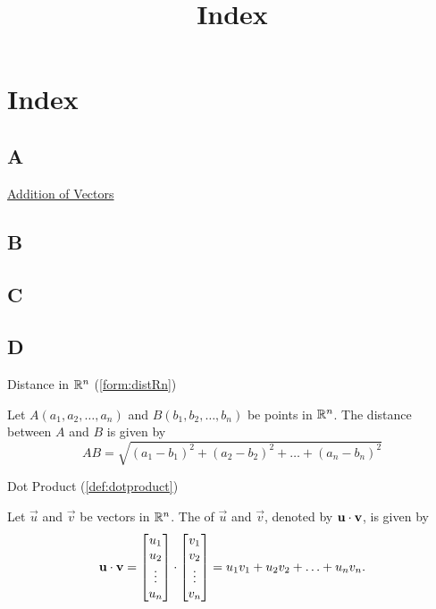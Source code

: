 \documentclass{ximera}
\title{Index} \license{CC BY-NC-SA 4.0}
\begin{document}
\begin{abstract}
\end{abstract}
\maketitle



\section{Index}
\subsection{A}
\href{https://ximera.osu.edu/oerlinalg/LinearAlgebra/VEC-0030/main}{Addition of Vectors}
\subsection{B}

\subsection{C}

\subsection{D}
Distance in $\mathbb{R}^n$ (\ref{form:distRn})
\begin{expandable}
Let $A(a_1, a_2,\ldots ,a_n)$ and $B(b_1, b_2,\ldots ,b_n)$ be points in $\mathbb{R}^n$.  The distance between $A$ and $B$ is given by
$$AB=\sqrt{(a_1-b_1)^2+(a_2-b_2)^2+\ldots +(a_n-b_n)^2}$$
\end{expandable}

Dot Product (\ref{def:dotproduct})
\begin{expandable}
  Let $\vec{u}$ and $\vec{v}$ be vectors in $\mathbb{R}^n$.  The  of $\vec{u}$ and $\vec{v}$, denoted by
  $\mathbf{u}\cdot \mathbf{v}$, is given by
  \begin{align*}
\mathbf{u}\cdot\mathbf{v}=\begin{bmatrix}u_1\\u_2\\\vdots\\u_n\end{bmatrix}\cdot\begin{bmatrix}v_1\\v_2\\\vdots\\v_n\end{bmatrix}=u_1v_1+u_2v_2+\ldots+u_nv_n.
  \end{align*}
\end{expandable}
\end{document}
